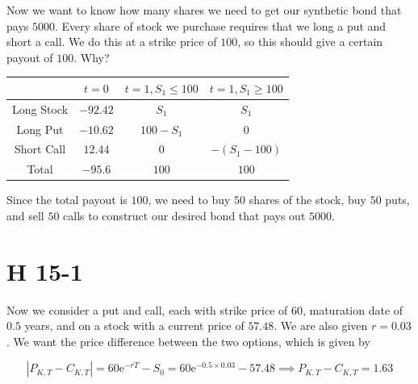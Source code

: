 \documentclass[12pt, letterpaper]{article}
\newcommand{\e}{\mathrm{e}}
\begin{document}
    Now we want to know how many shares we need to get our synthetic bond that pays \(5000\). Every share of stock we purchase requires that we long a put and short a call. We do this at a strike price of \(100\), so this should give a certain payout of \(100\). Why? 

    \begin{tabular}{|c|c|c|c|}
        \hline
         & \(t = 0\) & \(t = 1, S_1 \leq 100\) & \(t = 1, S_1 \geq 100\) \\
         \hline
         Long Stock & \(-92.42\) & \(S_1\) & \(S_1\) \\ 
         \hline
         Long Put & \(-10.62\) & \(100 - S_1\) & \(0\) \\
         \hline
         Short Call & \(12.44\) & \(0\) & \(-(S_1 - 100)\) \\
         \hline
         Total & \(-95.6\) & \(100\) & \(100\) \\
         \hline
    \end{tabular}

    Since the total payout is \(100\), we need to buy \(50\) shares of the stock, buy \(50\) puts, and sell \(50\) calls to construct our desired bond that pays out \(5000\). 

    \section{H 15-1}

    Now we consider a put and call, each with strike price of \(60\), maturation date of \(0.5\) years, and on a stock with a current price of \(57.48\). We are also given \(r = 0.03\). We want the price difference between the two options, which is given by 

    \[ | P_{K,T} - C_{K,T} |  = 60 \e^{-rT} - S_0 = 60 \e^{-0.5 \times 0.03} - 57.48 \implies \boxed{P_{K,T} - C_{K,T} = 1.63}   \]
\end{document}
